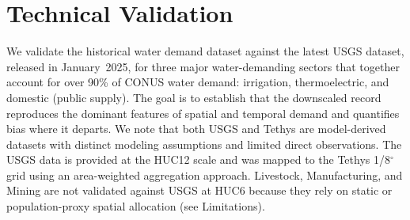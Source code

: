 \documentclass[fleqn,10pt]{wlscirep}
\begin{document}

\section*{Technical Validation}

We validate the historical water demand dataset against the latest USGS dataset\cite{Stets2025USGS}, released in January~2025, for three major water-demanding sectors that together account for over 90\% of CONUS water demand: irrigation, thermoelectric, and domestic (public supply)\cite{skinnerWaterWithdrawalConsumption2025}. The goal is to establish that the downscaled record reproduces the dominant features of spatial and temporal demand and quantifies bias where it departs. We note that both USGS and Tethys are model-derived datasets with distinct modeling assumptions and limited direct observations. The USGS data is provided at the HUC12 scale and was mapped to the Tethys 1/8$^{\circ}$ grid using an area-weighted aggregation approach. Livestock, Manufacturing, and Mining are not validated against USGS at HUC6 because they rely on static or population-proxy spatial allocation (see Limitations).
\end{document}
